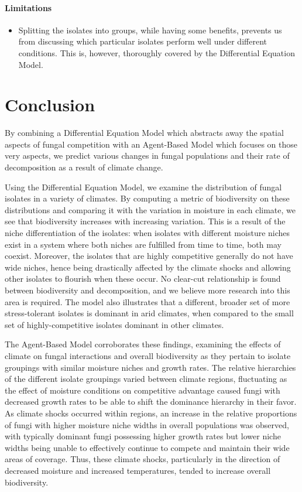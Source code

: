 \documentclass[12pt]{article}
\begin{document}
\paragraph{Limitations}
\begin{itemize}
    \item Splitting the isolates into groups, while having some benefits, prevents us from discussing which particular isolates perform well under different conditions. This is, however, thoroughly covered by the Differential Equation Model.
\end{itemize}

\section{Conclusion}

By combining a Differential Equation Model which abstracts away the spatial aspects of fungal competition with an Agent-Based Model which focuses on those very aspects, we predict various changes in fungal populations and their rate of decomposition as a result of climate change.

Using the Differential Equation Model, we examine the distribution of fungal isolates in a variety of climates. By computing a metric of biodiversity on these distributions and comparing it with the variation in moisture in each climate, we see that biodiversity increases with increasing variation. This is a result of the niche differentiation of the isolates: when isolates with different moisture niches exist in a system where both niches are fulfilled from time to time, both may coexist. Moreover, the isolates that are highly competitive generally do not have wide niches, hence being drastically affected by the climate shocks and allowing other isolates to flourish when these occur. No clear-cut relationship is found between biodiversity and decomposition, and we believe more research into this area is required. The model also illustrates that a different, broader set of more stress-tolerant isolates is dominant in arid climates, when compared to the small set of highly-competitive isolates dominant in other climates. 

The Agent-Based Model corroborates these findings, examining the effects of climate on fungal interactions and overall biodiversity as they pertain to isolate groupings with similar moisture niches and growth rates.  The relative hierarchies of the different isolate groupings varied between climate regions, fluctuating as the effect of moisture conditions on competitive advantage caused fungi with decreased growth rates to be able to shift the dominance hierarchy in their favor.  As climate shocks occurred within regions, an increase in the relative proportions of fungi with higher moisture niche widths in overall populations was observed, with typically dominant fungi possessing higher growth rates but lower niche widths being unable to effectively continue to compete and maintain their wide areas of coverage.  Thus, these climate shocks, particularly in the direction of decreased moisture and increased temperatures, tended to increase overall biodiversity.   
\end{document}
